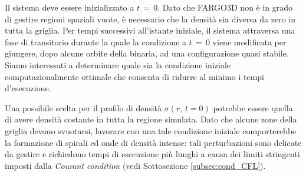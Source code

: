 Il sistema deve essere inizializzato a $t\,=\,0$. Dato che FARGO3D non è in grado di gestire regioni spaziali vuote, è necessario che la densità sia diversa da zero in tutta la griglia.
Per tempi successivi all'istante iniziale, il sistema attraversa una fase di transitorio durante la quale la condizione a $t\,=\,0$ viene modificata per giungere, dopo alcune orbite della binaria, ad una configurazione quasi stabile.
Siamo interessati a determinare quale sia la condizione iniziale computazionalmente ottimale che consenta di ridurre al minimo i tempi d'esecuzione.

Una possibile scelta per il profilo di densità $\sigma(r,\,t=0)$ potrebbe essere quella di avere densità costante in tutta la regione simulata. Dato che alcune zone della griglia devono svuotarsi, lavorare con una tale condizione iniziale comporterebbe la formazione di spirali ed onde di densità intense: tali perturbazioni sono delicate da gestire e richiedono tempi di esecuzione più lunghi a causa dei limiti stringenti imposti dalla \textit{Courant condition} (vedi Sottosezione \ref{subsec:cond_CFL}).


